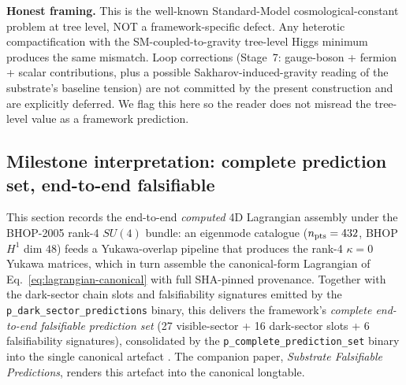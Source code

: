 ﻿\documentclass[reprint,amsmath,amssymb,aps,prd,longbibliography,floatfix]{revtex4-2}
\begin{document}
\textbf{Honest framing.} This is the well-known Standard-Model
cosmological-constant problem at tree level, NOT a framework-specific
defect. Any heterotic compactification with the SM-coupled-to-gravity
tree-level Higgs minimum produces the same mismatch. Loop corrections
(Stage~7: gauge-boson + fermion + scalar contributions, plus a
possible Sakharov-induced-gravity reading of the substrate's
baseline tension) are not committed by the present construction and
are explicitly deferred. We flag this here so the reader does not
misread the tree-level value as a framework prediction.

\subsection{Milestone interpretation: complete prediction set, end-to-end falsifiable}
\label{subsec:stage4-milestone}

This section records the end-to-end \emph{computed} 4D Lagrangian
assembly under the BHOP-2005 rank-4 $SU(4)$ bundle: an eigenmode
catalogue ($n_{\rm pts}=432$, BHOP $H^1$ dim $48$) feeds a
Yukawa-overlap pipeline that produces the rank-4 $\kappa = 0$ Yukawa
matrices, which in turn assemble the canonical-form Lagrangian of
Eq.~\eqref{eq:lagrangian-canonical} with full SHA-pinned provenance.
Together with the dark-sector chain slots and falsifiability signatures
emitted by the \texttt{p\_dark\_sector\_predictions} binary, this
delivers the framework's \emph{complete end-to-end falsifiable
prediction set} (27 visible-sector + 16 dark-sector slots + 6
falsifiability signatures), consolidated by the
\texttt{p\_complete\_prediction\_set} binary into the single canonical
artefact . The companion
paper, \emph{Substrate Falsifiable Predictions}, renders this artefact
into the canonical longtable.
\end{document}
